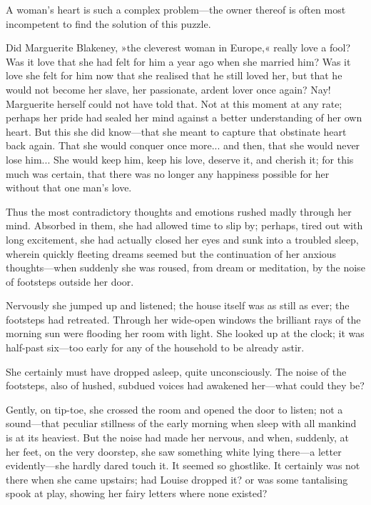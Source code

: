 A woman's heart is such a complex problem\allowbreak---\allowbreak the owner thereof is often most incompetent to find the solution of this puzzle.

Did Marguerite Blakeney, »the cleverest woman in Europe,« really love a fool? Was it love that she had felt for him a year ago when she married him? Was it love she felt for him now that she realised that he still loved her, but that he would not become her slave, her passionate, ardent lover once again? Nay! Marguerite herself could not have told that. Not at this moment at any rate; perhaps her pride had sealed her mind against a better understanding of her own heart. But this she did know\allowbreak---\allowbreak that she meant to capture that obstinate heart back again. That she would conquer once more... and then, that she would never lose him... She would keep him, keep his love, deserve it, and cherish it; for this much was certain, that there was no longer any happiness possible for her without that one man's love.

Thus the most contradictory thoughts and emotions rushed madly through her mind. Absorbed in them, she had allowed time to slip by; perhaps, tired out with long excitement, she had actually closed her eyes and sunk into a troubled sleep, wherein quickly fleeting dreams seemed but the continuation of her anxious  thoughts\allowbreak---\allowbreak when suddenly she was roused, from dream or meditation, by the noise of footsteps outside her door.

Nervously she jumped up and listened; the house itself was as still as ever; the footsteps had retreated. Through her wide-open windows the brilliant rays of the morning sun were flooding her room with light. She looked up at the clock; it was half-past six\allowbreak---\allowbreak too early for any of the household to be already astir.

She certainly must have dropped asleep, quite unconsciously. The noise of the footsteps, also of hushed, subdued voices had awakened her\allowbreak---\allowbreak what could they be?

Gently, on tip-toe, she crossed the room and opened the door to listen; not a sound\allowbreak---\allowbreak that peculiar stillness of the early morning when sleep with all mankind is at its heaviest. But the noise had made her nervous, and when, suddenly, at her feet, on the very doorstep, she saw something white lying there\allowbreak---\allowbreak a letter evidently\allowbreak---\allowbreak she hardly dared touch it. It seemed so ghostlike. It certainly was not there when she came upstairs; had Louise dropped it? or was some tantalising spook at play, showing her fairy letters where none existed?

